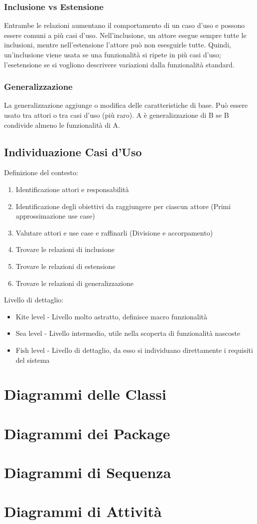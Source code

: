 \subsubsection{Inclusione vs Estensione}
Entrambe le relazioni aumentano il comportamento di un caso d'uso e possono essere comuni a più casi d'uso. 
Nell'inclusione, un attore esegue sempre tutte le inclusioni, mentre nell'estensione l'attore può non esesguirle tutte.
Quindi, un'inclusione viene usata se una funzionalità si ripete in più casi d'uso; 
l'esetensione se si vogliono descrivere variazioni dalla funzionalità standard. 

\subsubsection{Generalizzazione}
La generalizzazione aggiunge o modifica delle caratteristiche di base. 
Può essere usato tra attori o tra casi d'uso (più raro). 
A è generalizzazione di B se B condivide almeno le funzionalità di A.

\subsection{Individuazione Casi d'Uso}

Definizione del contesto:
\begin{enumerate}
\item Identificazione attori e responsabilità
\item Identificazione degli obiettivi da raggiungere per ciascun attore (Primi approssimazione use case)
\item Valutare attori e use case e raffinarli (Divisione e accorpamento)
\item Trovare le relazioni di inclusione
\item Trovare le relazioni di estensione
\item Trovare le relazioni di generalizzazione
\end{enumerate}

Livello di dettaglio:
\begin{itemize}
\item Kite level - Livello molto astratto, definisce macro funzionalità
\item Sea level - Livello intermedio, utile nella scoperta di funzionalità nascoste
\item Fish level - Livello di dettaglio, da esso si individuano direttamente i requisiti del sistema
\end{itemize}

\section{Diagrammi delle Classi}
\section{Diagrammi dei Package}
\section{Diagrammi di Sequenza}
\section{Diagrammi di Attività}